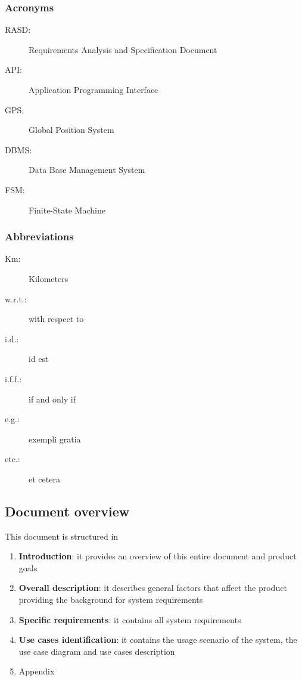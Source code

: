 \subsubsection{Acronyms}
	\begin{description}
		\item [RASD:] Requirements Analysis and Specification Document
		\item [API:] Application Programming Interface
		\item [GPS:] Global Position System
		\item [DBMS:] Data Base Management System
		\item [FSM:] Finite-State Machine
	\end{description}
\subsubsection{Abbreviations}
	\begin{description}
		\item [Km:] Kilometers
		\item [w.r.t.:] with respect to
		\item [i.d.:] id est
		\item [i.f.f.:] if and only if
		\item [e.g.:] exempli gratia
		\item [etc.:] et cetera
	\end{description}

\subsection{Document overview}
This document is structured in 
\begin{enumerate}
	\item \textbf{Introduction}: it provides an overview of this entire document and product goals
	\item \textbf{Overall description}: it describes general factors that affect the product providing the background for system requirements
	\item \textbf{Specific requirements}: it contains all system requirements
	\item \textbf{Use cases identification}: it contains the usage scenario of the system, the use case diagram and use cases description
	\item Appendix
\end{enumerate}